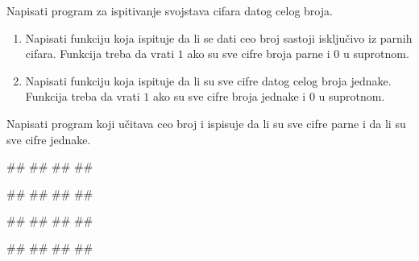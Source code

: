 \begin{Exercise}[label=v1.4_10] 
Napisati program za ispitivanje svojstava cifara datog celog broja.
\begin{enumerate}
\item Napisati funkciju  koja ispituje da li
  se dati ceo broj sastoji isključivo iz parnih cifara. Funkcija treba
  da vrati $1$ ako su sve cifre broja parne i $0$ u suprotnom.
\item Napisati funkciju  koja ispituje da
  li su sve cifre datog celog broja jednake. Funkcija treba da vrati $1$
  ako su sve cifre broja jednake i $0$ u suprotnom.
\end{enumerate}
Napisati program koji učitava ceo broj i ispisuje da li su sve cifre
parne i da li su sve cifre jednake.

\begin{miditest}
\begin{upotreba}{1}
#\naslovInt#
##
##
##
\end{upotreba}
\end{miditest}
\begin{miditest}
\begin{upotreba}{2}
#\naslovInt#
##
##
##
\end{upotreba}
\end{miditest}

\begin{miditest}
\begin{upotreba}{3}
#\naslovInt#
##
##
##
\end{upotreba}
\end{miditest}
\begin{miditest}
\begin{upotreba}{4}
#\naslovInt#
##
##
##
\end{upotreba}
\end{miditest}

\end{Exercise}
\begin{Answer}[ref=v1.4_10]
\end{Answer}





